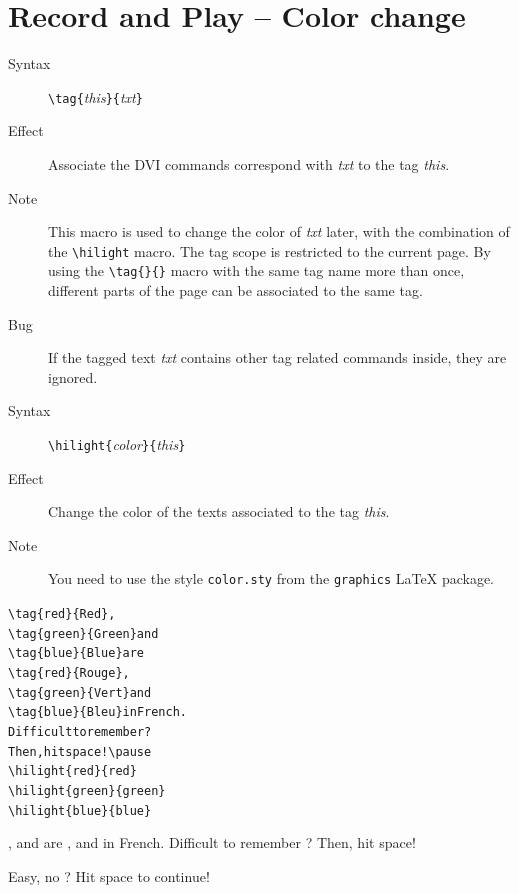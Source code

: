 \documentclass{article}
\begin{document}
\section{Record and Play -- Color change}

\begin{description}
\item[Syntax]  \verb!\tag{!{\em{this}}\verb!}{!{\em{txt}}\verb!}!
\item[Effect] Associate the DVI commands correspond with {\em{txt}} to
  the {\ActiveDVI} tag {\em{this}}.
\item[Note] This macro is used to change the color of {\em{txt}}
  later, with the combination of the \verb!\hilight! macro.
  The tag scope is restricted to the current page.
  By using the \verb!\tag{}{}! macro with the same tag name more than once,
  different parts of the page can be associated to the same tag.
\item[Bug] If the tagged text {\em{txt}} contains other tag related
 commands inside, they are ignored.
\end{description}

\begin{description}
\item[Syntax]  \verb!\hilight{!{\em{color}}\verb!}{!{\em{this}}\verb!}!
\item[Effect] Change the color of the texts associated to the tag {\em{this}}.
\item[Note] You need to use the style \verb!color.sty! from the
\verb"graphics" LaTeX package.
\end{description}

\begin{minipage}[t]{0.5\textwidth}
\begin{alltt}
{\color{blue}\verb!\tag{red}{Red}!}, 
{\color{blue}\verb!\tag{green}{Green}!} and 
{\color{blue}\verb!\tag{blue}{Blue}!} are
{\color{blue}\verb!\tag{red}{Rouge}!}, 
{\color{blue}\verb!\tag{green}{Vert}!} and 
{\color{blue}\verb!\tag{blue}{Bleu}!} in French.
Difficult to remember ?
Then, hit space!\verb!\pause!
{\color{blue}\verb!\hilight{red}{red}!}
{\color{blue}\verb!\hilight{green}{green}!}
{\color{blue}\verb!\hilight{blue}{blue}!}
\end{alltt}
\end{minipage}
\begin{minipage}[t]{0.5\textwidth}
, 
 and 
 are
, 
 and 
 in French.
Difficult to remember ? 
Then, hit space!\pause
{}
\end{minipage}
\noindent
Easy, no ? Hit space to continue!\pause
\end{document}
